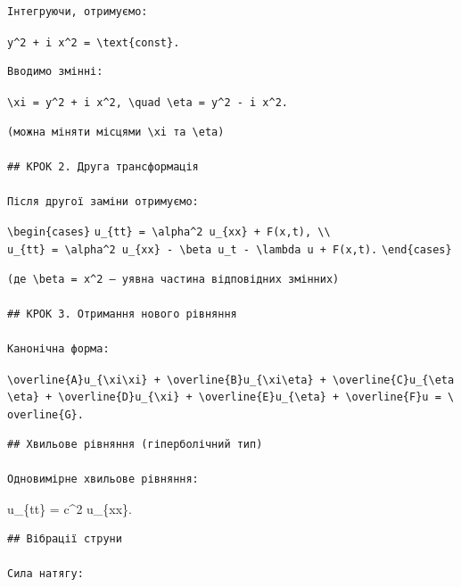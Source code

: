 \documentclass[
  ukrainian,
]{article}
\begin{document}
\begin{verbatim}
Інтегруючи, отримуємо:
\end{verbatim}

\texttt{y\^{}2\ +\ i\ x\^{}2\ =\ \textbackslash{}text\{const\}.}

\begin{verbatim}
Вводимо змінні:
\end{verbatim}

\texttt{\textbackslash{}xi\ =\ y\^{}2\ +\ i\ x\^{}2,\ \textbackslash{}quad\ \textbackslash{}eta\ =\ y\^{}2\ -\ i\ x\^{}2.}

\begin{verbatim}
(можна міняти місцями \xi та \eta)

## КРОК 2. Друга трансформація

Після другої заміни отримуємо:
\end{verbatim}

\texttt{\textbackslash{}begin\{cases\}}
\texttt{u\_\{tt\}\ =\ \textbackslash{}alpha\^{}2\ u\_\{xx\}\ +\ F(x,t),\ \textbackslash{}\textbackslash{}}
\texttt{u\_\{tt\}\ =\ \textbackslash{}alpha\^{}2\ u\_\{xx\}\ -\ \textbackslash{}beta\ u\_t\ -\ \textbackslash{}lambda\ u\ +\ F(x,t).}
\texttt{\textbackslash{}end\{cases\}}

\begin{verbatim}
(де \beta = x^2 — уявна частина відповідних змінних)

## КРОК 3. Отримання нового рівняння

Канонічна форма:
\end{verbatim}

\texttt{\textbackslash{}overline\{A\}u\_\{\textbackslash{}xi\textbackslash{}xi\}\ +\ \textbackslash{}overline\{B\}u\_\{\textbackslash{}xi\textbackslash{}eta\}\ +\ \textbackslash{}overline\{C\}u\_\{\textbackslash{}eta\textbackslash{}eta\}\ +\ \textbackslash{}overline\{D\}u\_\{\textbackslash{}xi\}\ +\ \textbackslash{}overline\{E\}u\_\{\textbackslash{}eta\}\ +\ \textbackslash{}overline\{F\}u\ =\ \textbackslash{}overline\{G\}.}

\begin{verbatim}
## Хвильове рівняння (гіперболічний тип)

Одновимірне хвильове рівняння:
\end{verbatim}

u\_\{tt\} = c\^{}2 u\_\{xx\}.

\begin{verbatim}
## Вібрації струни

Сила натягу:
\end{verbatim}
\end{document}
